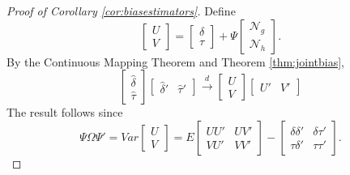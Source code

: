 \begin{proof}[Proof of Corollary \ref{cor:biasestimators}]
Define
	$$\left[\begin{array}{c} U\\ V \end{array}\right]=\left[\begin{array}{c}\delta\\ \tau\end{array} \right] +\Psi\left[\begin{array}{c}\mathscr{N}_g \\ \mathscr{N}_h \end{array}\right].$$
By the Continuous Mapping Theorem and Theorem \ref{thm:jointbias},
	$$\left[\begin{array}{c} \widehat{\delta} \\ \widehat{\tau} \end{array}\right]\left[\begin{array}{cc} \widehat{\delta}' & \widehat{\tau}'\end{array} \right] \overset{d}{\rightarrow} \left[\begin{array}{c} U\\V \end{array}\right]\left[\begin{array}{cc}U' & V'\end{array} \right] $$
The result follows since
$$\Psi\Omega\Psi' =Var\left[\begin{array}{c}U\\V\end{array}\right] = 
E\left[\begin{array}{cc} 
				UU'&UV'\\
				VU'&VV'
				\end{array}\right] - 
				\left[\begin{array}{cc}
				\delta\delta'&\delta\tau'\\
				\tau\delta'&\tau\tau'
				\end{array}\right].$$
\end{proof}


